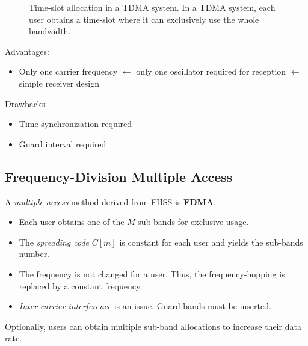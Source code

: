 \begin{refsection}
\begin{figure}[H]
	\caption[Time-slot allocation in a \acs{TDMA} system]{Time-slot allocation in a \acs{TDMA} system. In a \acs{TDMA} system, each user obtains a time-slot where it can exclusively use the whole bandwidth.}
\end{figure}

Advantages:
\begin{itemize}
	\item Only one carrier frequency $\leftarrow$ only one oscillator required for reception $\leftarrow$ simple receiver design
\end{itemize}

Drawbacks:
\begin{itemize}
	\item Time synchronization required
	\item Guard interval required
\end{itemize}

\subsection{Frequency-Division Multiple Access}

A \emph{multiple access} method derived from \ac{FHSS} is  \textbf{\acf{FDMA}}.
\begin{itemize}
	\item Each user obtains one of the $M$ sub-bands for exclusive usage.
	\item The \emph{spreading code} $C[m]$ is constant for each user and yields the sub-bands number.
	\item The frequency is not changed for a user. Thus, the frequency-hopping is replaced by a constant frequency.
	\item \emph{Inter-carrier interference} is an issue. Guard bands must be inserted.
\end{itemize}

\begin{remark}
	Optionally, users can obtain multiple sub-band allocations to increase their data rate.
\end{remark}

\begin{figure}[H]
	\centering
\end{figure}
\end{refsection}
